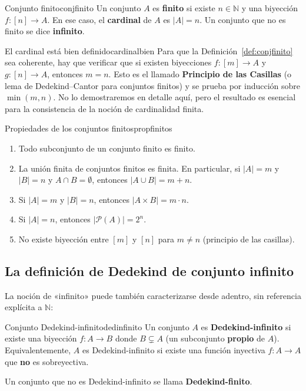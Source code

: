 \begin{definicion}{Conjunto finito}{conjfinito}
Un conjunto $A$ es \textbf{finito} si existe $n \in \mathbb{N}$ y una biyección $f: [n] \to A$. En ese caso, el \textbf{cardinal} de $A$ es $|A| = n$. Un conjunto que no es finito se dice \textbf{infinito}.
\end{definicion}

\begin{observacion}{El cardinal está bien definido}{cardinalbien}
Para que la Definición~\ref{def:conjfinito} sea coherente, hay que verificar que si existen biyecciones $f: [m] \to A$ y $g: [n] \to A$, entonces $m = n$. Esto es el llamado \textbf{Principio de las Casillas} (o lema de Dedekind–Cantor para conjuntos finitos) y se prueba por inducción sobre $\min(m,n)$. No lo demostraremos en detalle aquí, pero el resultado es esencial para la consistencia de la noción de cardinalidad finita.
\end{observacion}

\begin{proposicion}{Propiedades de los conjuntos finitos}{propfinitos}
\begin{enumerate}[leftmargin=2em, label=(\roman*)]
  \item Todo subconjunto de un conjunto finito es finito.
  \item La unión finita de conjuntos finitos es finita. En particular, si $|A| = m$ y $|B| = n$ y $A \cap B = \emptyset$, entonces $|A \cup B| = m + n$.
  \item Si $|A| = m$ y $|B| = n$, entonces $|A \times B| = m \cdot n$.
  \item Si $|A| = n$, entonces $|\mathcal{P}(A)| = 2^n$.
  \item No existe biyección entre $[m]$ y $[n]$ para $m \neq n$ (principio de las casillas).
\end{enumerate}
\end{proposicion}

\subsection{La definición de Dedekind de conjunto infinito}

La noción de «infinito» puede también caracterizarse desde adentro, sin referencia explícita a $\mathbb{N}$:

\begin{definicion}{Conjunto Dedekind-infinito}{dedinfinito}
Un conjunto $A$ es \textbf{Dedekind-infinito} si existe una biyección $f: A \to B$ donde $B \subsetneq A$ (un subconjunto \textbf{propio} de $A$). Equivalentemente, $A$ es Dedekind-infinito si existe una función inyectiva $f: A \to A$ que \textbf{no} es sobreyectiva.

Un conjunto que no es Dedekind-infinito se llama \textbf{Dedekind-finito}.
\end{definicion}

